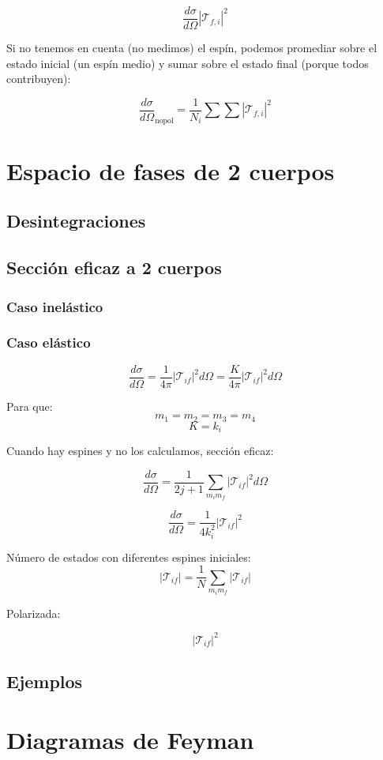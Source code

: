 $$
\frac{d\sigma}{d\Omega} \left| \mathcal{T}_{f,i} \right|^2
$$

Si no tenemos en cuenta (no medimos) el espín, podemos promediar sobre el estado inicial (un espín medio) y sumar sobre el estado final (porque todos contribuyen):

$$
\frac{d\sigma}{d\Omega}_{\text{nopol}} = \frac{1}{N_i} \sum \sum \left| \mathcal{T}_{f,i} \right|^2
$$
\section{Espacio de fases de 2 cuerpos}
\subsection{Desintegraciones}
\subsection{Sección eficaz a 2 cuerpos}

\subsubsection{Caso inelástico}
\subsubsection{Caso elástico}
$$
\frac{d\sigma}{d\Omega} = \frac{1}{4\pi} \left| \mathcal{T}_{if} \right|^2 d\Omega = \frac{K}{4\pi} \left| \mathcal{T}_{if} \right|^2 d\Omega
$$

Para que:
$$
m_1 = m_2 = m_3 = m_4
$$
$$
K = k_i
$$

Cuando hay espines y no los calculamos, sección eficaz:

$$
\frac{d\sigma}{d\Omega} = \frac{1}{2j+1} \sum_{m_i m_f} \left| \mathcal{T}_{if} \right|^2 d\Omega
$$

$$
\frac{d\sigma}{d\Omega} = \frac{1}{4 k_i^2} \left| \mathcal{T}_{if} \right|^2
$$

Número de estados con diferentes espines iniciales:
$$
\left| \mathcal{T}_{if} \right| = \frac{1}{N} \sum_{m_i m_f} \left| \mathcal{T}_{if} \right|
$$

Polarizada:

$$
\left| \mathcal{T}_{if} \right|^2
$$
\subsection{Ejemplos}
\section{Diagramas de Feyman}
